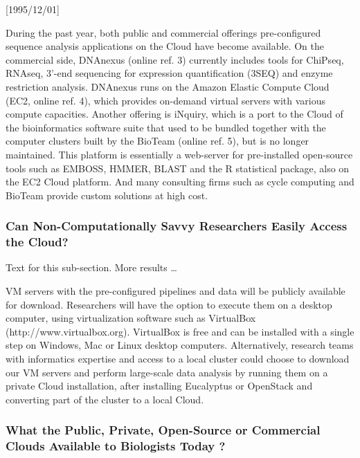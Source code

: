 \NeedsTeXFormat{LaTeX2e}[1995/12/01] \documentclass[10pt]{bmc_article}
\newenvironment{bmcformat}{\begin{raggedright}\baselineskip20pt\sloppy\setboolean{publ}{false}}{\end{raggedright}\baselineskip20pt\sloppy}
\begin{document}
\begin{bmcformat}
During the past year, both public and commercial offerings pre-configured sequence analysis applications on
the Cloud have become available. On the commercial side, DNAnexus (online ref.  3) currently includes tools
for ChiPseq, RNAseq, 3'-end sequencing for expression quantification (3SEQ) and enzyme restriction analysis.
DNAnexus runs on the Amazon Elastic Compute Cloud (EC2, online ref. 4), which provides on-demand virtual
servers with various compute capacities. Another offering is iNquiry, which is a port to the Cloud of the
bioinformatics software suite that used to be bundled together with the computer clusters built by the BioTeam
(online ref. 5), but is no longer maintained. This platform is essentially a web-server for pre-installed
open-source tools such as EMBOSS, HMMER, BLAST and the R statistical package, also on the EC2 Cloud platform.
And many consulting firms such as cycle computing and BioTeam provide custom solutions at high cost.


\subsubsection*{Can Non-Computationally Savvy Researchers Easily Access the Cloud?} Text for this sub-section.
More results \ldots

VM servers with the pre-configured pipelines and data will be publicly available for download. Researchers
will have the option to execute them on a desktop computer, using virtualization software such as VirtualBox
(http://www.virtualbox.org). VirtualBox is free and can be installed with a single step on Windows, Mac or
Linux desktop computers.  Alternatively, research teams with informatics expertise and access to a local
cluster could choose to download our VM servers and perform large-scale data analysis by running them on a
private Cloud installation, after installing Eucalyptus or OpenStack and converting part of the cluster to a
local Cloud. 

\subsubsection*{What the Public, Private, Open-Source or Commercial Clouds Available to Biologists Today ?} 


\end{bmcformat}
\end{document}
